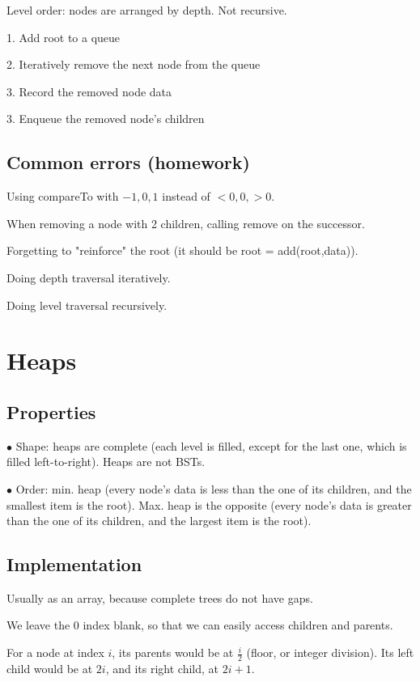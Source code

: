 \documentclass[english,openany]{book}
\begin{document}
	Level order: nodes are arranged by depth. Not recursive.

	1. Add root to a queue

	2. Iteratively remove the next node from the queue

	3. Record the removed node data

	3. Enqueue the removed node's children\\

	\section{Common errors (homework)}

	Using compareTo with $-1, 0, 1$ instead of $< 0, 0, >0$.

	When removing a node with 2 children, calling remove on the successor.

	Forgetting to "reinforce" the root (it should be root = add(root,data)).

	Doing depth traversal iteratively.

	Doing level traversal recursively.

	\chapter{Heaps}

    \section{Properties}

	$\bullet$ Shape: heaps are complete (each level is filled, except for the last one, which is filled left-to-right). Heaps are not BSTs.

	$\bullet$ Order: min. heap (every node's data is less than the one of its children, and the smallest item is the root). Max. heap is the opposite (every node's data is greater than the one of its children, and the largest item is the root).\\

	\section{Implementation}

	Usually as an array, because complete trees do not have gaps.

	We leave the 0 index blank, so that we can easily access children and parents.

	For a node at index $i$, its parents would be at $\frac{i}{2}$ (floor, or integer division). Its left child would be at $2i$, and its right child, at $2i + 1$.
\end{document}
